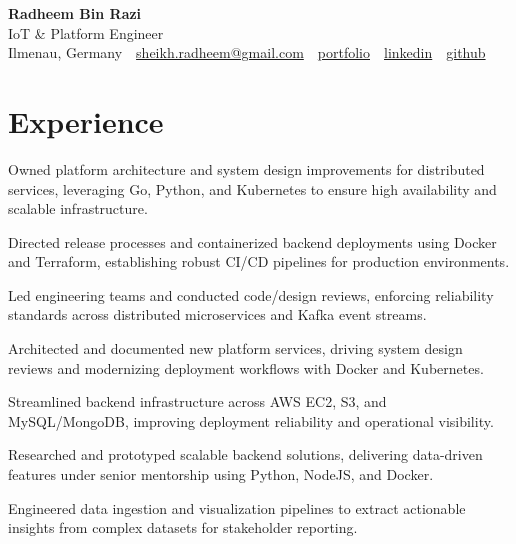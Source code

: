 \documentclass[11pt,a4paper]{resume}
\makeatletter
\newcommand{\Portfolio}{https://radheem.github.io/my-cv}
\newcommand{\PortfolioText}{portfolio}
\newcommand{\GitHub}{https://github.com/radheem}
\newcommand{\LinkedIn}{https://www.linkedin.com/in/radheem-razi}
\newcommand{\Email}{sheikh.radheem@gmail.com}
\makeatother
\begin{document}
\begin{center}
  {\huge\bfseries Radheem Bin Razi}\\[3pt]
  {\large IoT \& Platform Engineer}\\[6pt]
  \small
  Ilmenau, Germany \,\textbar\,
  \href{mailto:\Email}{\Email} \,\textbar\,
  \href{\Portfolio}{\PortfolioText} \,\textbar\,
  \href{\LinkedIn}{linkedin} \,\textbar\,
  \href{\GitHub}{github}
\end{center}
\vspace{2pt}

\section{Experience}

\bullets
  \item Owned platform architecture and system design improvements for distributed services, leveraging Go, Python, and Kubernetes to ensure high availability and scalable infrastructure.
  \item Directed release processes and containerized backend deployments using Docker and Terraform, establishing robust CI/CD pipelines for production environments.
  \item Led engineering teams and conducted code/design reviews, enforcing reliability standards across distributed microservices and Kafka event streams.
\bulletsend
\vspace{3pt}
\bullets
  \item Architected and documented new platform services, driving system design reviews and modernizing deployment workflows with Docker and Kubernetes.
  \item Streamlined backend infrastructure across AWS EC2, S3, and MySQL/MongoDB, improving deployment reliability and operational visibility.
\bulletsend
\vspace{3pt}
\bullets
  \item Researched and prototyped scalable backend solutions, delivering data-driven features under senior mentorship using Python, NodeJS, and Docker.
  \item Engineered data ingestion and visualization pipelines to extract actionable insights from complex datasets for stakeholder reporting.
\bulletsend
\vspace{3pt}
\end{document}
